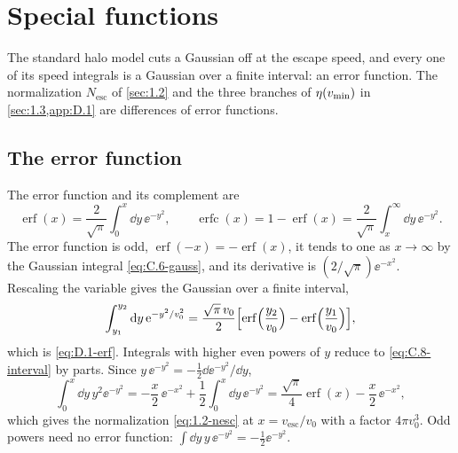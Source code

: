 \section{Special functions}\label{app:C.8}

The standard halo model cuts a Gaussian off at the escape speed, and every one of its speed integrals is a Gaussian over a finite interval: an error function. The normalization $N_{\mathrm{esc}}$ of \cref{sec:1.2} and the three branches of $\eta(v_{\mathrm{min}})$ in \cref{sec:1.3,app:D.1} are differences of error functions.

\subsection{The error function}

The error function and its complement are~\cite[Eqs.~(7.2.1) and (7.2.2)]{olver2010nist}
\begin{equation}
  \operatorname{erf}(x) = \frac{2}{\sqrt\pi}\int_0^x\dd y\,\ee^{-y^2}, \qquad \operatorname{erfc}(x) = 1 - \operatorname{erf}(x) = \frac{2}{\sqrt\pi}\int_x^\infty\dd y\,\ee^{-y^2} .
  \label{eq:C.8-erf}
\end{equation}
The error function is odd, $\operatorname{erf}(-x) = -\operatorname{erf}(x)$, it tends to one as $x \to \infty$ by the Gaussian integral \cref{eq:C.6-gauss}, and its derivative is $(2/\sqrt\pi)\ee^{-x^2}$. Rescaling the variable gives the Gaussian over a finite interval,
\begin{equation}
  \int_{y_1}^{y_2}\mathrm{d} y\,\mathrm{e}^{-y^2/v_0^2} = \frac{\sqrt\pi\,v_0}{2}\Bigl[\operatorname{erf}\Bigl(\frac{y_2}{v_0}\Bigr) - \operatorname{erf}\Bigl(\frac{y_1}{v_0}\Bigr)\Bigr] ,
  \label{eq:C.8-interval}
\end{equation}
which is \cref{eq:D.1-erf}. Integrals with higher even powers of $y$ reduce to \cref{eq:C.8-interval} by parts. Since $y\,\ee^{-y^2} = -\tfrac12\dd\ee^{-y^2}/\dd y$,
\begin{equation}
  \int_0^x\dd y\,y^2\ee^{-y^2} = -\frac{x}{2}\,\ee^{-x^2} + \frac12\int_0^x\dd y\,\ee^{-y^2} = \frac{\sqrt\pi}{4}\operatorname{erf}(x) - \frac{x}{2}\,\ee^{-x^2} ,
  \label{eq:C.8-y2}
\end{equation}
which gives the normalization \cref{eq:1.2-nesc} at $x = v_{\mathrm{esc}}/v_0$ with a factor $4\pi v_0^3$. Odd powers need no error function: $\int\dd y\,y\,\ee^{-y^2} = -\tfrac12\ee^{-y^2}$.

